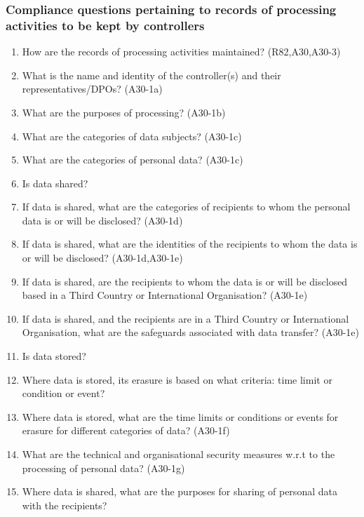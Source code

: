 \subsubsection{Compliance questions pertaining to records of processing activities to be kept by controllers}\label{sec:info:CQ:1}
\begin{enumerate}[label={\textit{CMQ.\theenumi}}]
    \item How are the records of processing activities maintained? (R82,A30,A30-3)
    \item What is the name and identity of the controller(s) and their representatives/DPOs? (A30-1a)
    \item What are the purposes of processing? (A30-1b)
    \item What are the categories of data subjects? (A30-1c)
    \item What are the categories of personal data? (A30-1c)
    \item Is data shared?
    \item If data is shared, what are the categories of recipients to whom the personal data is or will be disclosed? (A30-1d)
    \item If data is shared, what are the identities of the recipients to whom the data is or will be disclosed? (A30-1d,A30-1e)
    \item If data is shared, are the recipients to whom the data is or will be disclosed based in a Third Country or International Organisation? (A30-1e)
    \item If data is shared, and the recipients are in a Third Country or International Organisation, what are the safeguards associated with data transfer? (A30-1e)
    \item Is data stored?
    \item Where data is stored, its erasure is based on what criteria: time limit or condition or event?
    \item Where data is stored, what are the time limits or conditions or events for erasure for different categories of data? (A30-1f)
    \item What are the technical and organisational security measures w.r.t to the processing of personal data? (A30-1g)
    \item Where data is shared, what are the purposes for sharing of personal data with the recipients?
\end{enumerate}

